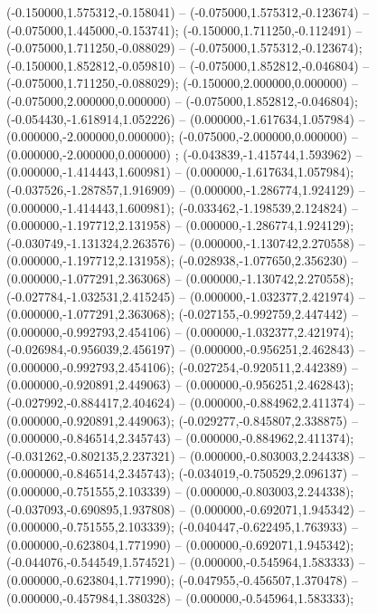  (-0.150000,1.575312,-0.158041) -- (-0.075000,1.575312,-0.123674) -- (-0.075000,1.445000,-0.153741);
 (-0.150000,1.711250,-0.112491) -- (-0.075000,1.711250,-0.088029) -- (-0.075000,1.575312,-0.123674);
 (-0.150000,1.852812,-0.059810) -- (-0.075000,1.852812,-0.046804) -- (-0.075000,1.711250,-0.088029);
 (-0.150000,2.000000,0.000000) -- (-0.075000,2.000000,0.000000) -- (-0.075000,1.852812,-0.046804);
 (-0.054430,-1.618914,1.052226) -- (0.000000,-1.617634,1.057984) -- (0.000000,-2.000000,0.000000);
 (-0.075000,-2.000000,0.000000) -- (0.000000,-2.000000,0.000000) ;
 (-0.043839,-1.415744,1.593962) -- (0.000000,-1.414443,1.600981) -- (0.000000,-1.617634,1.057984);
 (-0.037526,-1.287857,1.916909) -- (0.000000,-1.286774,1.924129) -- (0.000000,-1.414443,1.600981);
 (-0.033462,-1.198539,2.124824) -- (0.000000,-1.197712,2.131958) -- (0.000000,-1.286774,1.924129);
 (-0.030749,-1.131324,2.263576) -- (0.000000,-1.130742,2.270558) -- (0.000000,-1.197712,2.131958);
 (-0.028938,-1.077650,2.356230) -- (0.000000,-1.077291,2.363068) -- (0.000000,-1.130742,2.270558);
 (-0.027784,-1.032531,2.415245) -- (0.000000,-1.032377,2.421974) -- (0.000000,-1.077291,2.363068);
 (-0.027155,-0.992759,2.447442) -- (0.000000,-0.992793,2.454106) -- (0.000000,-1.032377,2.421974);
 (-0.026984,-0.956039,2.456197) -- (0.000000,-0.956251,2.462843) -- (0.000000,-0.992793,2.454106);
 (-0.027254,-0.920511,2.442389) -- (0.000000,-0.920891,2.449063) -- (0.000000,-0.956251,2.462843);
 (-0.027992,-0.884417,2.404624) -- (0.000000,-0.884962,2.411374) -- (0.000000,-0.920891,2.449063);
 (-0.029277,-0.845807,2.338875) -- (0.000000,-0.846514,2.345743) -- (0.000000,-0.884962,2.411374);
 (-0.031262,-0.802135,2.237321) -- (0.000000,-0.803003,2.244338) -- (0.000000,-0.846514,2.345743);
 (-0.034019,-0.750529,2.096137) -- (0.000000,-0.751555,2.103339) -- (0.000000,-0.803003,2.244338);
 (-0.037093,-0.690895,1.937808) -- (0.000000,-0.692071,1.945342) -- (0.000000,-0.751555,2.103339);
 (-0.040447,-0.622495,1.763933) -- (0.000000,-0.623804,1.771990) -- (0.000000,-0.692071,1.945342);
 (-0.044076,-0.544549,1.574521) -- (0.000000,-0.545964,1.583333) -- (0.000000,-0.623804,1.771990);
 (-0.047955,-0.456507,1.370478) -- (0.000000,-0.457984,1.380328) -- (0.000000,-0.545964,1.583333);
